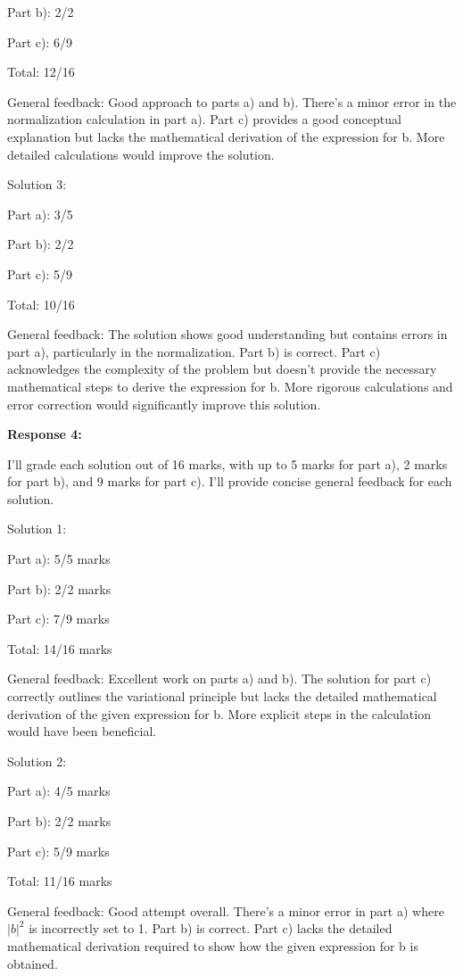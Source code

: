 \documentclass[a4paper,11pt]{article}
\begin{document}
Part b): 2/2

Part c): 6/9

Total: 12/16

General feedback: Good approach to parts a) and b). There's a minor error in the normalization calculation in part a). Part c) provides a good conceptual explanation but lacks the mathematical derivation of the expression for b. More detailed calculations would improve the solution.

Solution 3:

Part a): 3/5

Part b): 2/2

Part c): 5/9

Total: 10/16

General feedback: The solution shows good understanding but contains errors in part a), particularly in the normalization. Part b) is correct. Part c) acknowledges the complexity of the problem but doesn't provide the necessary mathematical steps to derive the expression for b. More rigorous calculations and error correction would significantly improve this solution.

\bigskip   
\textbf{Response 4:}

I'll grade each solution out of 16 marks, with up to 5 marks for part a), 2 marks for part b), and 9 marks for part c). I'll provide concise general feedback for each solution.

Solution 1:

Part a): 5/5 marks

Part b): 2/2 marks

Part c): 7/9 marks

Total: 14/16 marks

General feedback: Excellent work on parts a) and b). The solution for part c) correctly outlines the variational principle but lacks the detailed mathematical derivation of the given expression for b. More explicit steps in the calculation would have been beneficial.

Solution 2:

Part a): 4/5 marks

Part b): 2/2 marks

Part c): 5/9 marks

Total: 11/16 marks

General feedback: Good attempt overall. There's a minor error in part a) where \(|b|^2\) is incorrectly set to 1. Part b) is correct. Part c) lacks the detailed mathematical derivation required to show how the given expression for b is obtained.
\end{document}
